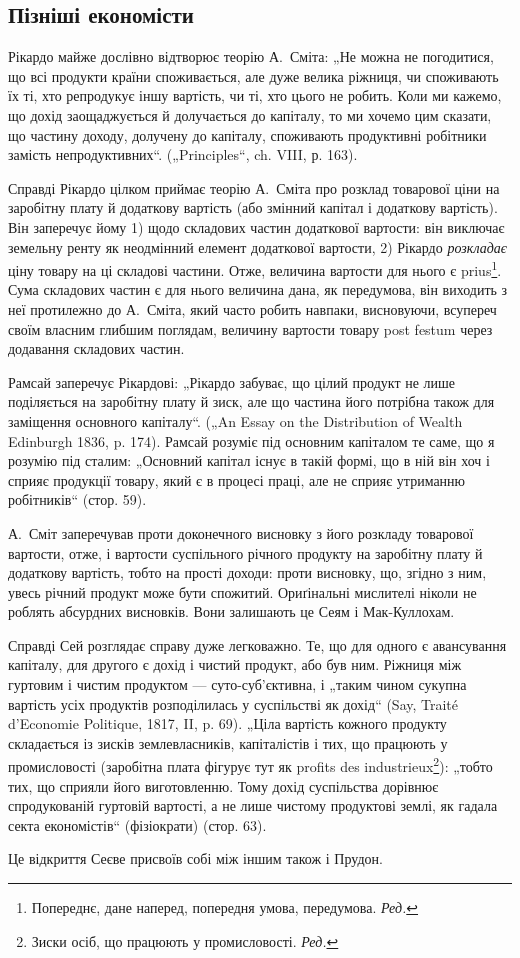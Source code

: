 \subsection[Пізніші економісти]{Пізніші економісти\footnotemark{}}


\label{original-299}
Рікардо
майже дослівно відтворює теорію А.~Сміта: „Не можна не
погодитися, що всі продукти країни споживається, але дуже велика ріжниця,
чи споживають їх ті, хто репродукує іншу вартість, чи ті, хто
цього не робить. Коли ми кажемо, що дохід заощаджується й долучається
до капіталу, то ми хочемо цим сказати, що частину доходу, долучену
до капіталу, споживають продуктивні робітники замість непродуктивних“.
(„Principles“, ch. VIII, р. 163).

Справді Рікардо цілком приймає теорію А.~Сміта про розклад товарової
ціни на заробітну плату й додаткову вартість (або змінний капітал
і додаткову вартість). Він заперечує йому 1) щодо складових частин
додаткової вартости: він виключає земельну ренту як неодмінний елемент
додаткової вартости, 2) Рікардо \emph{розкладає} ціну товару на ці складові
частини. Отже, величина вартости для нього є prius\footnote*{
Попереднє, дане наперед, попередня умова, передумова. \emph{Ред.}
}. Сума складових
частин є для нього величина дана, як передумова, він виходить з
неї протилежно до А.~Сміта, який часто робить навпаки, висновуючи,
всупереч своїм власним глибшим поглядам, величину вартости товару
post festum через додавання складових частин.

Рамсай заперечує Рікардові: „Рікардо забуває, що цілий продукт не
лише поділяється на заробітну плату й зиск, але що частина його потрібна
також для заміщення основного капіталу“. („An Essay on the Distribution
of Wealth Edinburgh 1836, p. 174). Рамсай розуміє під основним
капіталом те саме, що я розумію під сталим: „Основний капітал
існує в такій формі, що в ній він хоч і сприяє продукції товару, який є
в процесі праці, але не сприяє утриманню робітників“ (стор. 59).

А.~Сміт заперечував проти доконечного висновку з його розкладу
товарової вартости, отже, і вартости суспільного річного продукту на
заробітну плату й додаткову вартість, тобто на прості доходи: проти
висновку, що, згідно з ним, увесь річний продукт може бути спожитий.
Ориґінальні мислителі ніколи не роблять абсурдних висновків. Вони залишають
це Сеям і Мак-Куллохам.

Справді Сей розглядає справу дуже легковажно. Те, що для одного є
авансування капіталу, для другого є дохід і чистий продукт, або був ним.
Ріжниця між гуртовим і чистим продуктом — суто-суб’єктивна, і „таким чином
сукупна вартість усіх продуктів розподілилась у суспільстві як дохід“ (Say,
Traité d’Economie Politique, 1817, II, p. 69). „Ціла вартість кожного продукту
складається із зисків землевласників, капіталістів і тих, що працюють у
промисловості (заробітна плата фігурує тут як profits des industrieux\footnote*{
Зиски осіб, що працюють у промисловості. \emph{Ред.}
}):
„тобто тих, що сприяли його виготовленню. Тому дохід суспільства дорівнює
спродукованій   гуртовій   вартості, а не лише чистому
продуктові землі, як гадала секта економістів“ (фізіократи) (стор. 63).

Це відкриття Сеєве присвоїв собі між іншим також і Прудон.
